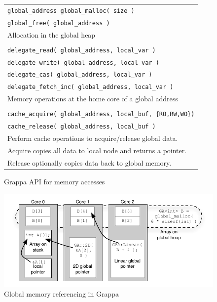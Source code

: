 \begin{figure}[htbp]
  \begin{center}
    \begin{minipage}{\columnwidth}
	\small
	\begin{tabular}{l}
      	\texttt{\scriptsize global\_address global\_malloc( size )} \\
      	\texttt{\scriptsize global\_free( global\_address )} \\ 
      	Allocation in the global heap \\ \\
      	\texttt{\scriptsize delegate\_read( global\_address, local\_var )}  \\
      	\texttt{\scriptsize delegate\_write( global\_address, local\_var )} \\
      	\texttt{\scriptsize delegate\_cas( global\_address, local\_var )} \\
      	\texttt{\scriptsize delegate\_fetch\_inc( global\_address, local\_var )} \\ 
      	Memory operations at the home core of a global address \\ \\
      	\texttt{\scriptsize cache\_acquire( global\_address, local\_buf, \{RO,RW,WO\})} \\
      	\texttt{\scriptsize cache\_release( global\_address, local\_buf )} \\ 
		Perform cache operations to acquire/release global data.  \\
		Acquire copies all data to local node and returns a pointer. \\ 	
		Release optionally copies data back to global memory. \\
	\end{tabular}
      \caption{\label{fig:accessing-memory} Grappa API for memory accesses}     \end{minipage}
  \end{center}
\end{figure}

\begin{figure}[t]
\begin{center}
  \includegraphics[width=0.95\columnwidth]{figs/memory-structure}
\begin{minipage}{0.95\columnwidth}
  \caption{\label{fig:memory-structure} Global memory referencing in Grappa}
\end{minipage}
\vspace{-3ex}
\end{center}
\end{figure}

